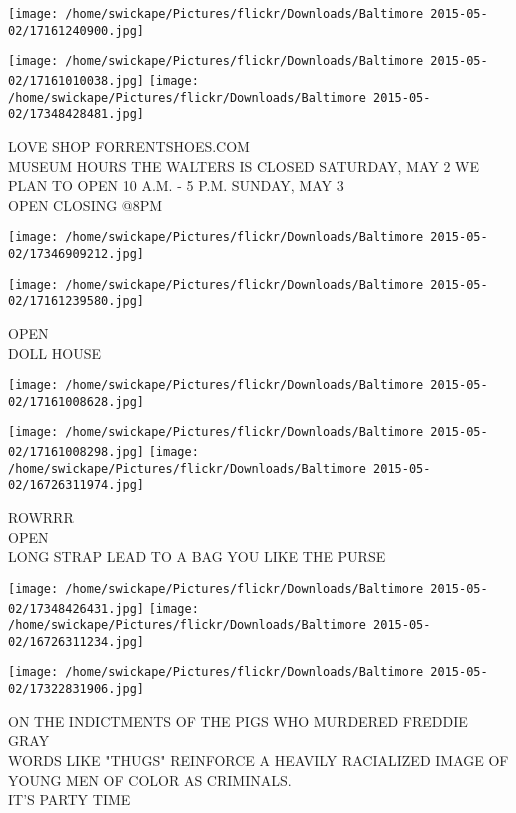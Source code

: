 \documentclass[10pt,letterpaper]{article}
\begin{document}
\texttt{[image: /home/swickape/Pictures/flickr/Downloads/Baltimore 2015-05-02/17161240900.jpg]}

\vspace{0.25in}
\texttt{[image: /home/swickape/Pictures/flickr/Downloads/Baltimore 2015-05-02/17161010038.jpg]}
\texttt{[image: /home/swickape/Pictures/flickr/Downloads/Baltimore 2015-05-02/17348428481.jpg]}

LOVE SHOP FORRENTSHOES.COM\\
MUSEUM HOURS THE WALTERS IS CLOSED SATURDAY, MAY 2 WE PLAN TO OPEN 10 A.M. {-} 5 P.M. SUNDAY, MAY 3\\
OPEN CLOSING @8PM\\
\pagebreak

\texttt{[image: /home/swickape/Pictures/flickr/Downloads/Baltimore 2015-05-02/17346909212.jpg]}

\vspace{0.25in}
\texttt{[image: /home/swickape/Pictures/flickr/Downloads/Baltimore 2015-05-02/17161239580.jpg]}

OPEN\\
DOLL HOUSE\\
\pagebreak

\texttt{[image: /home/swickape/Pictures/flickr/Downloads/Baltimore 2015-05-02/17161008628.jpg]}

\vspace{0.25in}
\texttt{[image: /home/swickape/Pictures/flickr/Downloads/Baltimore 2015-05-02/17161008298.jpg]}
\texttt{[image: /home/swickape/Pictures/flickr/Downloads/Baltimore 2015-05-02/16726311974.jpg]}

ROWRRR\\
OPEN\\
LONG STRAP LEAD TO A BAG YOU LIKE THE PURSE\\
\pagebreak

\texttt{[image: /home/swickape/Pictures/flickr/Downloads/Baltimore 2015-05-02/17348426431.jpg]}
\texttt{[image: /home/swickape/Pictures/flickr/Downloads/Baltimore 2015-05-02/16726311234.jpg]}

\texttt{[image: /home/swickape/Pictures/flickr/Downloads/Baltimore 2015-05-02/17322831906.jpg]}

ON THE INDICTMENTS OF THE PIGS WHO MURDERED FREDDIE GRAY\\
WORDS LIKE "THUGS" REINFORCE A HEAVILY RACIALIZED IMAGE OF YOUNG MEN OF COLOR AS CRIMINALS.\\
IT'S PARTY TIME\\
\pagebreak
\end{document}

